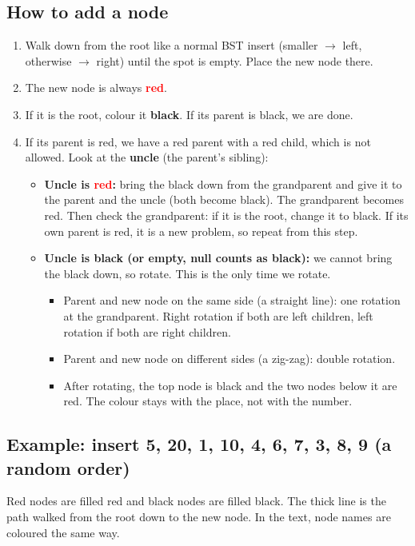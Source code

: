 \documentclass[11pt]{article}
\newcommand{\rd}[1]{\textcolor{Red}{\textbf{#1}}}   %
\newcommand{\bk}[1]{\textbf{#1}}                    %
\begin{document}
	\subsection{How to add a node}
	\begin{enumerate}
		\item Walk down from the root like a normal BST insert (smaller $\to$ left, otherwise $\to$ right) until the spot is empty. Place the new node there.
		\item The new node is always \rd{red}.
		\item If it is the root, colour it \bk{black}. If its parent is black, we are done.
		\item If its parent is red, we have a red parent with a red child, which is not allowed. Look at the \textbf{uncle} (the parent's sibling):
		\begin{itemize}
			\item \textbf{Uncle is \rd{red}:} bring the black down from the grandparent and give it to the parent and the uncle (both become black). The grandparent becomes red. Then check the grandparent: if it is the root, change it to black. If its own parent is red, it is a new problem, so repeat from this step.
			\item \textbf{Uncle is \bk{black} (or empty, null counts as black):} we cannot bring the black down, so rotate. This is the only time we rotate.
			\begin{itemize}
				\item Parent and new node on the same side (a straight line): one rotation at the grandparent. Right rotation if both are left children, left rotation if both are right children.
				\item Parent and new node on different sides (a zig-zag): double rotation.
				\item After rotating, the top node is black and the two nodes below it are red. The colour stays with the place, not with the number.
			\end{itemize}
		\end{itemize}
	\end{enumerate}
	
	\subsection{Example: insert 5, 20, 1, 10, 4, 6, 7, 3, 8, 9 (a random order)}
	Red nodes are filled red and black nodes are filled black. The thick line is the path walked from the root down to the new node. In the text, node names are coloured the same way.
	
\end{document}
